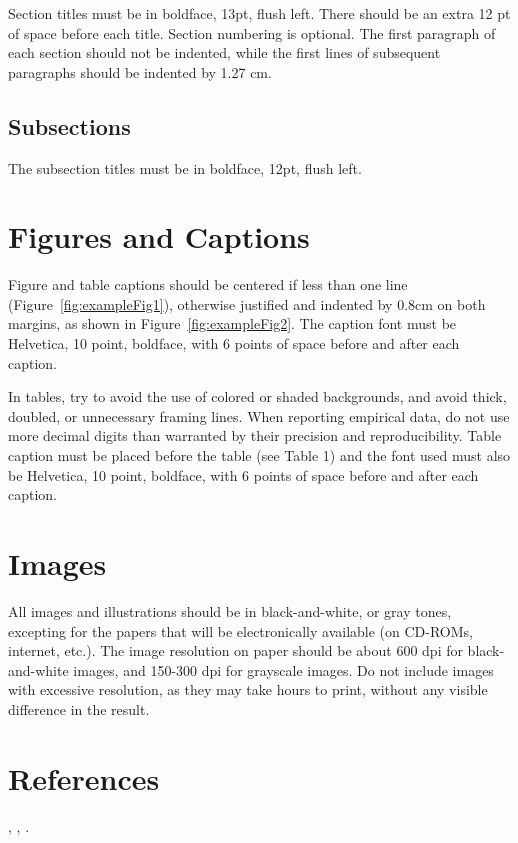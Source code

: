 \documentclass[12pt]{article}
\begin{document}
Section titles must be in boldface, 13pt, flush left. There should be an extra
12 pt of space before each title. Section numbering is optional. The first
paragraph of each section should not be indented, while the first lines of
subsequent paragraphs should be indented by 1.27 cm.

\subsection{Subsections}

The subsection titles must be in boldface, 12pt, flush left.

\section{Figures and Captions}\label{sec:figs}


Figure and table captions should be centered if less than one line
(Figure~\ref{fig:exampleFig1}), otherwise justified and indented by 0.8cm on
both margins, as shown in Figure~\ref{fig:exampleFig2}. The caption font must
be Helvetica, 10 point, boldface, with 6 points of space before and after each
caption.

In tables, try to avoid the use of colored or shaded backgrounds, and avoid
thick, doubled, or unnecessary framing lines. When reporting empirical data,
do not use more decimal digits than warranted by their precision and
reproducibility. Table caption must be placed before the table (see Table 1)
and the font used must also be Helvetica, 10 point, boldface, with 6 points of
space before and after each caption.

\section{Images}

All images and illustrations should be in black-and-white, or gray tones,
excepting for the papers that will be electronically available (on CD-ROMs,
internet, etc.). The image resolution on paper should be about 600 dpi for
black-and-white images, and 150-300 dpi for grayscale images.  Do not include
images with excessive resolution, as they may take hours to print, without any
visible difference in the result. 

\section{References}

\cite{1}, \cite{2}, \cite{3}.



\end{document}

